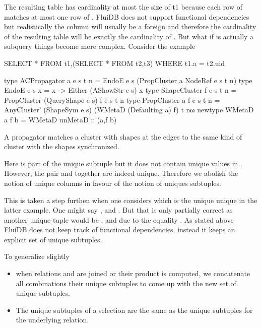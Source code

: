 The resulting table has cardinality at most the size of t1 because
each row of  matches at most one row of . FluiDB does not
support functional dependencies but realistically the column  will
usually be a foreign and therefore the cardinality of the resulting
table will be exactly the cardinality of . But what if  is
actually a subquery things become more complex. Consider the example

\begin{sqlcode}
  SELECT *
  FROM t1,(SELECT * FROM t2,t3)
  WHERE t1.a = t2.uid
\end{sqlcode}


\begin{code}
  \begin{haskellcode}
    type ACPropagator a e s t n =
      EndoE e s (PropCluster a NodeRef e s t n)
    type EndoE e s x = x -> Either (AShowStr e s) x
    type ShapeCluster f e s t n = PropCluster (QueryShape e s) f e s t n
    type PropCluster a f e s t n =
      AnyCluster' (ShapeSym e s) (WMetaD (Defaulting a) f) t nω
    newtype WMetaD a f b = WMetaD { unMetaD :: (a,f b)}
  \end{haskellcode}
  \caption{\label{org945807f}A propagator matches a cluster with
        shapes at the edges to the same kind of cluster with the
        shapes synchronized.}
\end{code}


Here  is part of the unique subtuple but it does not contain
unique values in . However, the pair  and
 together are indeed unique. Therefore we abolish the notion
of unique columns in favour of the notion of uniques subtuples.

This is taken a step furthen when one considers which is the unique
unique in the latter example. One might say ,
 and . But that is only partially
correct as another unique tuple would be ,
 and  due to the equality . As stated above FluiDB does not keep track of functional
dependencies, instead it keeps an explicit set of unique subtuples.

To generalize slightly

\begin{itemize}
\item when relations  and  are joined or their product is computed,
  we concatenate all combinations their unique subtuples to come up
  with the new set of unique subtuples.
\item The unique subtuples of a selection are the same as the unique
  subtuples for the underlying relation.
\end{itemize}

